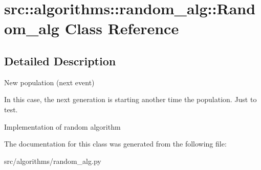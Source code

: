 \hypertarget{classsrc_1_1algorithms_1_1random__alg_1_1Random__alg}{
\section{src::algorithms::random\_\-alg::Random\_\-alg Class Reference}
\label{classsrc_1_1algorithms_1_1random__alg_1_1Random__alg}
}


\subsection{Detailed Description}
\begin{DoxyVerb}
    New population (next event)
    \end{DoxyVerb}
 \begin{DoxyVerb}
    In this case, the next generation is starting another time the population.
    Just to test.
    \end{DoxyVerb}
 \begin{DoxyVerb}
Implementation of random algorithm
\end{DoxyVerb}
 

The documentation for this class was generated from the following file:\begin{DoxyCompactItemize}
\item 
src/algorithms/random\_\-alg.py\end{DoxyCompactItemize}

